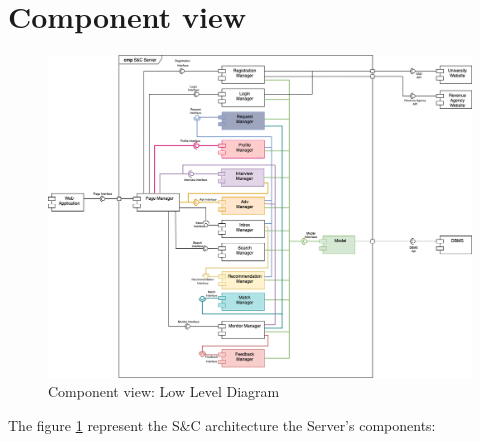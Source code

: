\section{Component view}
\begin{figure}[H]
    \centering
    \includegraphics[width=15cm]{images/architectural design/DD-ArchitecturalManager.png}
    \caption{Component view: Low Level Diagram}
    \label{figure:LowLevelDiagram}
\end{figure}
The figure \ref{figure:LowLevelDiagram} represent the S\&C architecture the Server's components:
